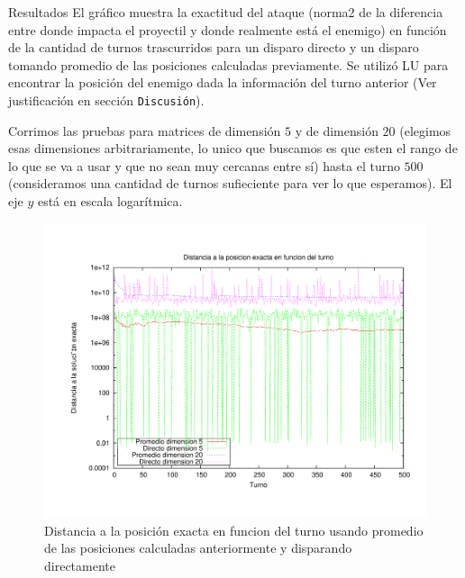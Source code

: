 \begin{section}{Resultados}
	El gráfico muestra la exactitud del ataque (norma2 de la diferencia entre donde impacta el proyectil y donde realmente está el enemigo) en función de la cantidad de turnos trascurridos para un disparo directo y un disparo tomando promedio de las posiciones calculadas previamente.
	Se utilizó LU para encontrar la posición del enemigo dada la información del turno anterior (Ver justificación en sección \texttt{Discusión}).
	
	Corrimos las pruebas para matrices de dimensión $5$ y de dimensión $20$ (elegimos esas dimensiones arbitrariamente, lo unico que buscamos es que esten el rango de lo que se va a usar y que no sean muy cercanas entre sí) hasta el turno $500$ (consideramos una cantidad de turnos sufieciente para ver lo que esperamos). El eje $y$ está en escala logarítmica.
	
	
	\begin{figure}[H]
	  \centering
		\includegraphics[width=14cm]{graficos/prom_vs_direct.pdf}
	  \caption{Distancia a la posición exacta en funcion del turno usando promedio de las posiciones calculadas anteriormente y disparando directamente}
	  \label{fig:prom_vs_direct}
	\end{figure}
	
	\VSP
\end{section}
